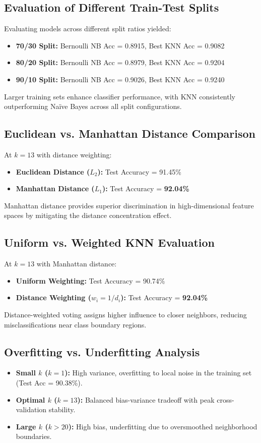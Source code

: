 \documentclass[12pt,a4paper]{article}
\begin{document}
\subsection{Evaluation of Different Train-Test Splits}
Evaluating models across different split ratios yielded:
\begin{itemize}
    \item \textbf{70/30 Split:} Bernoulli NB Acc = 0.8915, Best KNN Acc = 0.9082
    \item \textbf{80/20 Split:} Bernoulli NB Acc = 0.8979, Best KNN Acc = 0.9204
    \item \textbf{90/10 Split:} Bernoulli NB Acc = 0.9026, Best KNN Acc = 0.9240
\end{itemize}
Larger training sets enhance classifier performance, with KNN consistently outperforming Na\"ive Bayes across all split configurations.

\subsection{Euclidean vs. Manhattan Distance Comparison}
At $k=13$ with distance weighting:
\begin{itemize}
    \item \textbf{Euclidean Distance ($L_2$):} Test Accuracy = 91.45\%
    \item \textbf{Manhattan Distance ($L_1$):} Test Accuracy = \textbf{92.04\%}
\end{itemize}
Manhattan distance provides superior discrimination in high-dimensional feature spaces by mitigating the distance concentration effect.

\subsection{Uniform vs. Weighted KNN Evaluation}
At $k=13$ with Manhattan distance:
\begin{itemize}
    \item \textbf{Uniform Weighting:} Test Accuracy = 90.74\%
    \item \textbf{Distance Weighting ($w_i = 1/d_i$):} Test Accuracy = \textbf{92.04\%}
\end{itemize}
Distance-weighted voting assigns higher influence to closer neighbors, reducing misclassifications near class boundary regions.

\subsection{Overfitting vs. Underfitting Analysis}
\begin{itemize}
    \item \textbf{Small $k$ ($k=1$):} High variance, overfitting to local noise in the training set (Test Acc = 90.38\%).
    \item \textbf{Optimal $k$ ($k=13$):} Balanced bias-variance tradeoff with peak cross-validation stability.
    \item \textbf{Large $k$ ($k > 20$):} High bias, underfitting due to oversmoothed neighborhood boundaries.
\end{itemize}
\end{document}
